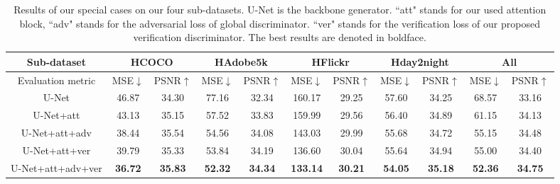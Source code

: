 \documentclass[10pt,twocolumn,letterpaper]{article}
\begin{document}
\setlength{\tabcolsep}{5pt}
\begin{table*}[tb]
\centering
\begin{tabular}{|l|c|c|c|c|c|c|c|c|c|c|}
\hline
\multicolumn{1}{|c|}{Sub-dataset} & \multicolumn{2}{c|}{HCOCO} & \multicolumn{2}{c|}{HAdobe5k} & \multicolumn{2}{c|}{HFlickr} & \multicolumn{2}{c|}{Hday2night} & \multicolumn{2}{c|}{All}\\ \hline
\multicolumn{1}{|c|}{Evaluation metric} & MSE$\downarrow$ & PSNR$\uparrow$ & MSE$\downarrow$ & PSNR$\uparrow$ & MSE$\downarrow$ & PSNR$\uparrow$ & MSE$\downarrow$ & PSNR$\uparrow$ & MSE$\downarrow$ & PSNR$\uparrow$ \\ \hline
\multicolumn{1}{|c|}{U-Net} & 46.87 & 34.30 & 77.16 & 32.34 & 160.17 & 29.25 & 57.60 & 34.25 & 68.57 & 33.16 \\ \hline
\multicolumn{1}{|c|}{U-Net+att} & 43.13 & 35.15 & 57.52 & 33.83 & 159.99 & 29.56 & 56.40 & 34.89 & 61.15 & 34.13 \\ \hline
\multicolumn{1}{|c|}{U-Net+att+adv} & 38.44 & 35.54 & 54.56 & 34.08 & 143.03 & 29.99 & 55.68 & 34.72 & 55.15 & 34.48 \\ \hline
\multicolumn{1}{|c|}{U-Net+att+ver} & 39.79 & 35.33 & 53.84 & 34.19 & 136.60 & 30.04 & 55.64 & 34.94 & 55.00 & 34.40 \\ \hline
\multicolumn{1}{|c|}{U-Net+att+adv+ver} & \bf36.72 & \bf35.83 & \bf52.32 & \bf34.34 & \bf133.14 & \bf30.21 & \bf54.05 & \bf35.18 & \bf52.36 & \bf34.75 \\ \hline
\end{tabular}
\caption{Results of our special cases on our four sub-datasets. U-Net is the backbone generator. ``att" stands for our used attention block, ``adv" stands for the adversarial loss of global discriminator. ``ver" stands for the verification loss of our proposed verification discriminator. The best results are denoted in boldface.}
\label{tab:ablate_loss}
\end{table*}
\end{document}
